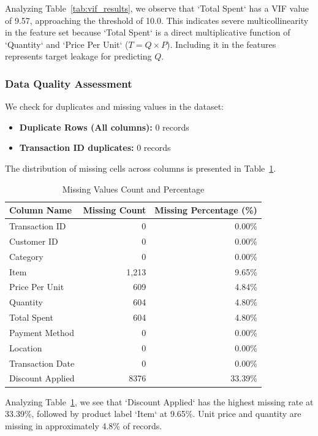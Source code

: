 \documentclass[12pt,a4paper]{article}
\begin{document}
Analyzing Table~\ref{tab:vif_results}, we observe that `Total Spent` has a VIF value of 9.57, approaching the threshold of 10.0. This indicates severe multicollinearity in the feature set because `Total Spent` is a direct multiplicative function of `Quantity` and `Price Per Unit` ($T = Q \times P$). Including it in the features represents target leakage for predicting $Q$.

\subsubsection{Data Quality Assessment}
We check for duplicates and missing values in the dataset:
\begin{itemize}
    \item \textbf{Duplicate Rows (All columns):} 0 records
    \item \textbf{Transaction ID duplicates:} 0 records
\end{itemize}
The distribution of missing cells across columns is presented in Table~\ref{tab:lab2_missing}.
\begin{table}[H]
\centering
\caption{Missing Values Count and Percentage}
\label{tab:lab2_missing}
\begin{tabular}{lrr}
\toprule
\textbf{Column Name} & \textbf{Missing Count} & \textbf{Missing Percentage (\%)} \\
\midrule
Transaction ID & 0 & 0.00\% \\
Customer ID & 0 & 0.00\% \\
Category & 0 & 0.00\% \\
Item & 1,213 & 9.65\% \\
Price Per Unit & 609 & 4.84\% \\
Quantity & 604 & 4.80\% \\
Total Spent & 604 & 4.80\% \\
Payment Method & 0 & 0.00\% \\
Location & 0 & 0.00\% \\
Transaction Date & 0 & 0.00\% \\
Discount Applied & 8376 & 33.39\% \\
\bottomrule
\end{tabular}
\end{table}

Analyzing Table~\ref{tab:lab2_missing}, we see that `Discount Applied` has the highest missing rate at 33.39\%, followed by product label `Item` at 9.65\%. Unit price and quantity are missing in approximately 4.8\% of records.
\end{document}

